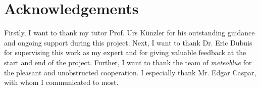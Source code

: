 \section*{Acknowledgements}
Firstly, I want to thank my tutor Prof. Urs K\"unzler for his outstanding guidance and ongoing support during this project.
\emptyline
Next, I want to thank Dr. Eric Dubuis for supervising this work as my expert and for giving valuable feedback at the start and end of the project.
\emptyline
Further, I want to thank the team of \emph{meteoblue} for the pleasant and unobstructed cooperation. I especially thank Mr. Edgar Caspar, with whom I communicated to most.